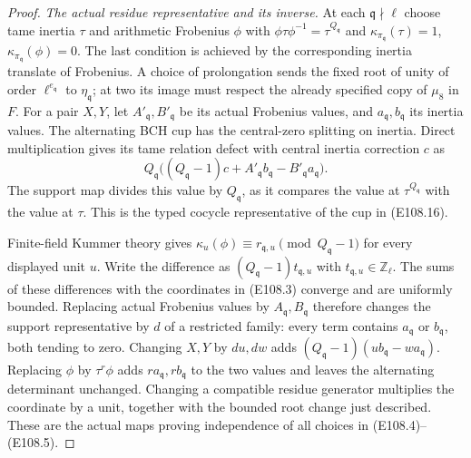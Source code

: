 \begin{proof}
\emph{The actual residue representative and its inverse.}
At each $\mathfrak q\nmid\ell$ choose tame inertia $\tau$
and arithmetic Frobenius $\phi$ with
$\phi\tau\phi^{-1}=\tau^{Q_{\mathfrak q}}$ and
$\kappa_{\pi_{\mathfrak q}}(\tau)=1$,
$\kappa_{\pi_{\mathfrak q}}(\phi)=0$.
The last condition is achieved by the corresponding inertia
translate of Frobenius.  A choice of prolongation sends the
fixed root of unity of order $\ell^{e_{\mathfrak q}}$ to
$\eta_{\mathfrak q}$; at two its image must respect the
already specified copy of $\mu_8$ in $F$.
For a pair $X,Y$, let $A'_{\mathfrak q},B'_{\mathfrak q}$
be its actual Frobenius values, and $a_{\mathfrak q},
b_{\mathfrak q}$ its inertia values.  The alternating BCH
cup has the central-zero splitting on inertia.  Direct
multiplication gives its tame relation defect with central
inertia correction $c$ as
\[
 Q_{\mathfrak q}\bigl((Q_{\mathfrak q}-1)c
       +A'_{\mathfrak q}b_{\mathfrak q}
       -B'_{\mathfrak q}a_{\mathfrak q}\bigr).
 \tag{E108.18}
\]
The support map divides this value by $Q_{\mathfrak q}$,
as it compares the value at $\tau^{Q_{\mathfrak q}}$ with
the value at $\tau$.  This is the typed cocycle representative
of the cup in (E108.16).

Finite-field Kummer theory gives
$\kappa_u(\phi)\equiv r_{\mathfrak q,u}
\pmod{Q_{\mathfrak q}-1}$ for every displayed unit $u$.
Write the difference as $(Q_{\mathfrak q}-1)t_{\mathfrak q,u}$
with $t_{\mathfrak q,u}\in\mathbb Z_\ell$.
The sums of these differences with the coordinates in
(E108.3) converge and are uniformly bounded.  Replacing
actual Frobenius values by $A_{\mathfrak q},B_{\mathfrak q}$
therefore changes the support representative by $d$ of a
restricted family: every term contains
$a_{\mathfrak q}$ or $b_{\mathfrak q}$, both tending to zero.
Changing $X,Y$ by $du,dw$ adds
$(Q_{\mathfrak q}-1)(u b_{\mathfrak q}-w a_{\mathfrak q})$.
Replacing $\phi$ by $\tau^r\phi$ adds
$r a_{\mathfrak q},r b_{\mathfrak q}$ to the two values
and leaves the alternating determinant unchanged.
Changing a compatible residue generator multiplies the
coordinate by a unit, together with the bounded root change
just described.  These are the actual maps proving
independence of all choices in (E108.4)--(E108.5).


\end{proof}
